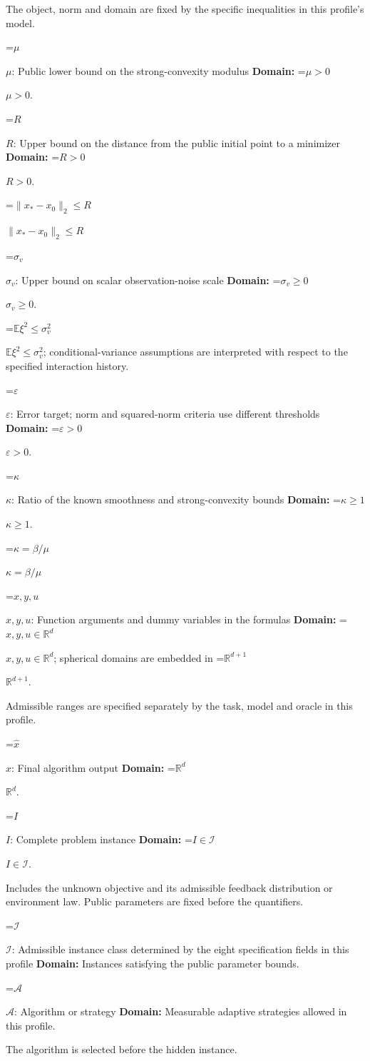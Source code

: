\documentclass[10pt,a4paper]{article}
\newcommand{\AtlasMath}[1]{\par\begingroup\centering\setbox0=\hbox{$\displaystyle #1$}\ifdim\wd0>1.4\linewidth\typeout{ATLAS WIDE FORMULA: \the\wd0}\fi\ifdim\wd0>\linewidth\resizebox{\linewidth}{!}{\box0}\else\box0\fi\par\endgroup}
\newcommand{\AtlasInlineMath}[1]{\begingroup\setbox0=\hbox{$#1$}\ifdim\wd0>.4\linewidth\endgroup\AtlasMath{#1}\else\endgroup$#1$\fi}
\begin{document}
The object, norm and domain are fixed by the specific inequalities in this profile's model.

\AtlasInlineMath{\mu}: Public lower bound on the strong-convexity modulus \textbf{Domain:} \AtlasInlineMath{\mu>0}.

\AtlasInlineMath{R}: Upper bound on the distance from the public initial point to a minimizer \textbf{Domain:} \AtlasInlineMath{R>0}.

\AtlasInlineMath{\|x_*-x_0\|_2\le R}

\AtlasInlineMath{\sigma_v}: Upper bound on scalar observation-noise scale \textbf{Domain:} \AtlasInlineMath{\sigma_v\ge0}.

\AtlasInlineMath{\mathbb{E}\xi^2\le\sigma_v^2}; conditional-variance assumptions are interpreted with respect to the specified interaction history.

\AtlasInlineMath{\varepsilon}: Error target; norm and squared-norm criteria use different thresholds \textbf{Domain:} \AtlasInlineMath{\varepsilon>0}.

\AtlasInlineMath{\kappa}: Ratio of the known smoothness and strong-convexity bounds \textbf{Domain:} \AtlasInlineMath{\kappa\ge1}.

\AtlasInlineMath{\kappa=\beta/\mu}

\AtlasInlineMath{x,y,u}: Function arguments and dummy variables in the formulas \textbf{Domain:} \AtlasInlineMath{x,y,u\in\mathbb{R}^d}; spherical domains are embedded in \AtlasInlineMath{\mathbb{R}^{d+1}}.

Admissible ranges are specified separately by the task, model and oracle in this profile.

\AtlasInlineMath{\widehat{x}}: Final algorithm output \textbf{Domain:} \AtlasInlineMath{\mathbb{R}^d}.

\AtlasInlineMath{I}: Complete problem instance \textbf{Domain:} \AtlasInlineMath{I\in\mathcal{I}}.

Includes the unknown objective and its admissible feedback distribution or environment law. Public parameters are fixed before the quantifiers.

\AtlasInlineMath{\mathcal{I}}: Admissible instance class determined by the eight specification fields in this profile \textbf{Domain:} Instances satisfying the public parameter bounds.

\AtlasInlineMath{\mathcal{A}}: Algorithm or strategy \textbf{Domain:} Measurable adaptive strategies allowed in this profile.

The algorithm is selected before the hidden instance.
\end{document}
